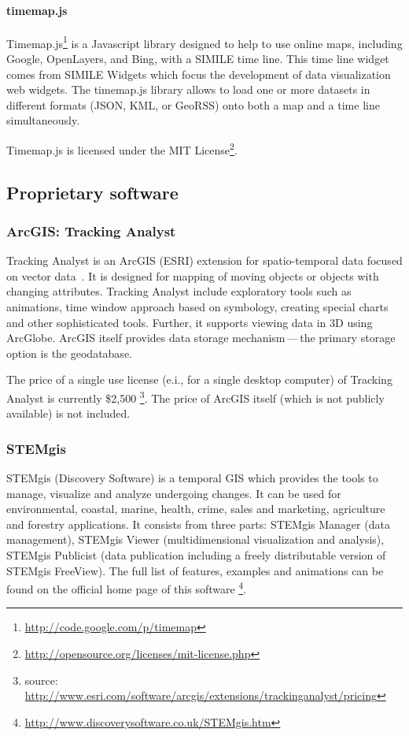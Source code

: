 \documentclass[a4paper,12pt,oneside]{book}
\newcommand{\dash}{\mbox{\,---\,}}
\begin{document}
\paragraph{timemap.js}
Timemap.js\footnote{\url{http://code.google.com/p/timemap}}
is a Javascript library designed to help to use online maps,
including Google, OpenLayers, and Bing, with a SIMILE time line.
This time line widget comes from SIMILE Widgets which focus the development of data visualization web widgets.
The timemap.js library allows to load one or more datasets in different formats (JSON, KML, or GeoRSS)
onto both a map and a time line simultaneously.

Timemap.js is licensed under the MIT License\footnote{\url{http://opensource.org/licenses/mit-license.php}}.



\subsection{Proprietary software}
\subsubsection{ArcGIS: Tracking Analyst}
Tracking Analyst is an ArcGIS (ESRI) extension for spatio-temporal data focused on vector data~\cite{arcgisHelp}.
It is designed for mapping of moving objects or objects with changing attributes.
Tracking Analyst include exploratory tools such as animations, time window approach based on symbology,
creating special charts and other sophisticated tools.
Further, it supports viewing data in 3D using ArcGlobe. 
ArcGIS itself provides data storage mechanism\dash the primary storage option is the geodatabase.

The price of a single use license (e.i., for a single desktop computer)
of Tracking Analyst is currently \$2,500%
\footnote{source: \url{http://www.esri.com/software/arcgis/extensions/trackinganalyst/pricing}}.
The price of ArcGIS itself (which is not publicly available) is not included.

\subsubsection{STEMgis}
STEMgis (Discovery Software) is a temporal GIS which provides the tools to manage, visualize
and analyze undergoing changes.
It can be used for environmental, coastal, marine, health, crime, sales and marketing,
agriculture and forestry applications.
It consists from three parts: STEMgis Manager (data management), 
STEMgis Viewer (multidimensional visualization and analysis),
STEMgis Publicist (data publication including a freely distributable version of STEMgis FreeView).
The full list of features, examples and animations can be found on the official home page of this software%
\footnote{\url{http://www.discoverysoftware.co.uk/STEMgis.htm}}.
\end{document}
